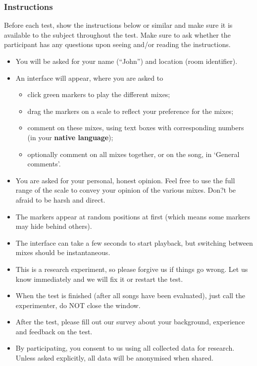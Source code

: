 \documentclass[11pt, oneside]{article}   	%
\begin{document}
		\subsubsection{Instructions} %
			Before each test, show the instructions below or similar and make sure it is available to the subject throughout the test. Make sure to ask whether the participant has any questions upon seeing and/or reading the instructions. 
			
			\begin{itemize}
			\item You will be asked for your name (``John'') and location (room identifier). 
			\item An interface will appear, where you are asked to 
			\begin{itemize}
				\item click green markers to play the different mixes;
				\item drag the markers on a scale to reflect your preference for the mixes;
				\item comment on these mixes, using text boxes with corresponding numbers (in your \textbf{native language});
				\item optionally comment on all mixes together, or on the song, in `General comments'. 
			\end{itemize}
			\item You are asked for your personal, honest opinion. Feel free to use the full range of the scale to convey your opinion of the various mixes. Don?t be afraid to be harsh and direct. 
			\item The markers appear at random positions at first (which means some markers may hide behind others). 
			\item The interface can take a few seconds to start playback, but switching between mixes should be instantaneous. 
			\item This is a research experiment, so please forgive us if things go wrong. Let us know immediately and we will fix it or restart the test.  
			\item When the test is finished (after all songs have been evaluated), just call the experimenter, do NOT close the window.  
			\item After the test, please fill out our survey about your background, experience and feedback on the test. 
			\item By participating, you consent to us using all collected data for research. Unless asked explicitly, all data will be anonymised when shared. 
			\end{itemize}
\end{document}
